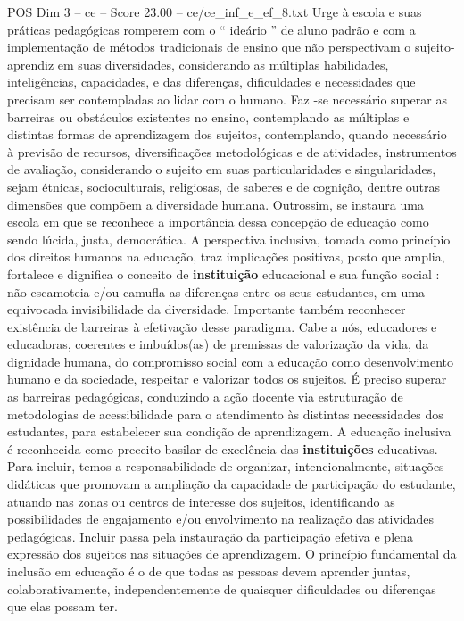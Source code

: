 \begin{textsample}{POS Dim 3 – ce – Score 23.00 – ce/ce\_inf\_e\_ef\_8.txt}
Urge à escola e suas práticas pedagógicas romperem com o “ ideário ” de aluno padrão e com a implementação de métodos tradicionais de ensino que não perspectivam o sujeito-aprendiz em suas diversidades, considerando as múltiplas habilidades, inteligências, capacidades, e das diferenças, dificuldades e necessidades que precisam ser contempladas ao lidar com o humano.
Faz -se necessário superar as barreiras ou obstáculos existentes no ensino, contemplando as múltiplas e distintas formas de aprendizagem dos sujeitos, contemplando, quando necessário à previsão de recursos, diversificações metodológicas e de atividades, instrumentos de avaliação, considerando o sujeito em suas particularidades e singularidades, sejam étnicas, socioculturais, religiosas, de saberes e de cognição, dentre outras dimensões que compõem a diversidade humana.
Outrossim, se instaura uma escola em que se reconhece a importância dessa concepção de educação como sendo lúcida, justa, democrática.
A perspectiva inclusiva, tomada como princípio dos direitos humanos na educação, traz implicações positivas, posto que amplia, fortalece e dignifica o conceito de \textbf{instituição} educacional e sua função social : não escamoteia e/ou camufla as diferenças entre os seus estudantes, em uma equivocada invisibilidade da diversidade.
Importante também reconhecer existência de barreiras à efetivação desse paradigma.
Cabe a nós, educadores e educadoras, coerentes e imbuídos(as) de premissas de valorização da vida, da dignidade humana, do compromisso social com a educação como desenvolvimento humano e da sociedade, respeitar e valorizar todos os sujeitos.
É preciso superar as barreiras pedagógicas, conduzindo a ação docente via estruturação de metodologias de acessibilidade para o atendimento às distintas necessidades dos estudantes, para estabelecer sua condição de aprendizagem.
A educação inclusiva é reconhecida como preceito basilar de excelência das \textbf{instituições} educativas.
Para incluir, temos a responsabilidade de organizar, intencionalmente, situações didáticas que promovam a ampliação da capacidade de participação do estudante, atuando nas zonas ou centros de interesse dos sujeitos, identificando as possibilidades de engajamento e/ou envolvimento na realização das atividades pedagógicas.
Incluir passa pela instauração da participação efetiva e plena expressão dos sujeitos nas situações de aprendizagem.
O princípio fundamental da inclusão em educação é o de que todas as pessoas devem aprender juntas, colaborativamente, independentemente de quaisquer dificuldades ou diferenças que elas possam ter.

\end{textsample}
